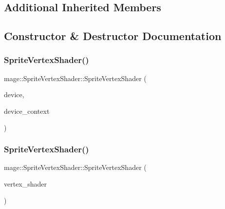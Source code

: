 \subsection*{Additional Inherited Members}


\subsection{Constructor \& Destructor Documentation}
\hypertarget{classmage_1_1_sprite_vertex_shader_a57f08ac16ace6190281fb4fa413c1b9e}{}\label{classmage_1_1_sprite_vertex_shader_a57f08ac16ace6190281fb4fa413c1b9e} 
\subsubsection{\texorpdfstring{Sprite\+Vertex\+Shader()}{SpriteVertexShader()}\hspace{0.1cm}{\footnotesize\ttfamily [1/3]}}
{\footnotesize\ttfamily mage\+::\+Sprite\+Vertex\+Shader\+::\+Sprite\+Vertex\+Shader (\begin{DoxyParamCaption}\item[{I\+D3\+D11\+Device2 $\ast$}]{device,  }\item[{I\+D3\+D11\+Device\+Context2 $\ast$}]{device\+\_\+context }\end{DoxyParamCaption})\hspace{0.3cm}{\ttfamily [explicit]}}

\hypertarget{classmage_1_1_sprite_vertex_shader_a00f902a89cc3f9c9ce3d5b526eece29c}{}\label{classmage_1_1_sprite_vertex_shader_a00f902a89cc3f9c9ce3d5b526eece29c} 
\subsubsection{\texorpdfstring{Sprite\+Vertex\+Shader()}{SpriteVertexShader()}\hspace{0.1cm}{\footnotesize\ttfamily [2/3]}}
{\footnotesize\ttfamily mage\+::\+Sprite\+Vertex\+Shader\+::\+Sprite\+Vertex\+Shader (\begin{DoxyParamCaption}\item[{const \hyperlink{classmage_1_1_sprite_vertex_shader}{Sprite\+Vertex\+Shader} \&}]{vertex\+\_\+shader }\end{DoxyParamCaption})\hspace{0.3cm}{\ttfamily [delete]}}


